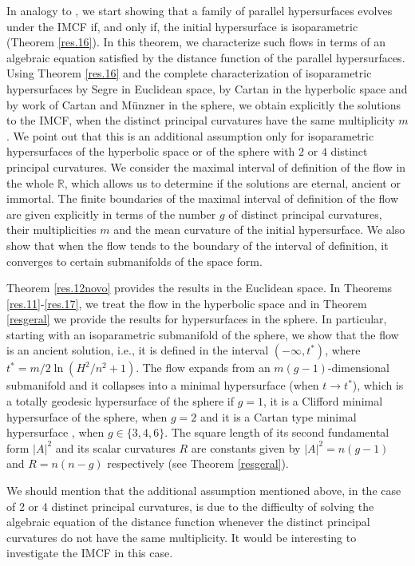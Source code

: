 \documentclass[11pt,a4paper,reqno]{amsproc}
\numberwithin{equation}{section}
\begin{document}
 
 In analogy to \cite{ReisTenenblat}, we start showing that a family of parallel hypersurfaces evolves under the IMCF if, and only if, the initial hypersurface is isoparametric (Theorem \ref{res.16}). In this theorem, we characterize such flows in terms of an algebraic equation satisfied by the distance function of the parallel hypersurfaces.   
 Using Theorem \ref{res.16} and the complete characterization of isoparametric hypersurfaces by Segre \cite{Segre} in Euclidean space, by Cartan \cite{Cartan} in the hyperbolic space and by work of Cartan \cite{Cartan} and M\"unzner \cite{Munzner} in the sphere,  
  we obtain  explicitly the solutions  to the IMCF, when the distinct principal curvatures  have the same multiplicity $m$. 
We point out that this is an additional assumption only for  
isoparametric hypersurfaces of the hyperbolic space or of the sphere
with $2$ or $4$ distinct principal curvatures. 
We consider the maximal interval of definition of the flow in the whole $\mathbb{R}$, which allows us to determine if the solutions are eternal, ancient or immortal. The finite boundaries of  the maximal interval of definition  of the flow are given explicitly in terms of the number $g$ of 
 distinct principal curvatures, their multiplicities $m$ and the mean curvature of  the initial hypersurface.   We also  show that when the flow tends to the boundary of the interval of definition, it converges to certain submanifolds of the space form.  


Theorem \ref{res.12novo} provides the results in the Euclidean space. In Theorems \ref{res.11}-\ref{res.17},  we treat the flow in the hyperbolic space and in Theorem \ref{resgeral} we provide the results for hypersurfaces in the sphere. 
   In particular, starting with an isoparametric submanifold of the sphere,  we show that the flow is an ancient solution, i.e.,  it is defined in the interval $(-\infty, t^*)$, where 
 $t^*=m/2\ln (H^2/n^2+1)$. The flow expands from  
  an $m(g-1)$-dimensional submanifold and it collapses into a minimal hypersurface (when $t\rightarrow t^*$),  which is a totally geodesic hypersurface of the sphere if $g=1$, 
it is a Clifford minimal hypersurface of the sphere, when $g=2$ and it is a Cartan type minimal hypersurface \cite{Cartan}, when $g\in\{3,4,6\}$. 
  The  square length of its second fundamental form $|A|^2$  and its scalar curvatures $R$ are constants 
given by $|A|^2=n(g-1)$ and $R=n(n-g)$ respectively  (see Theorem \ref{resgeral}).     

 We should mention that the additional assumption mentioned above, in the case of 2 or 4 distinct principal curvatures, is due to the difficulty of solving the algebraic equation of the distance function  whenever the distinct principal curvatures do not have the same multiplicity. It would be interesting to investigate the IMCF in this case. 
 
\end{document}
